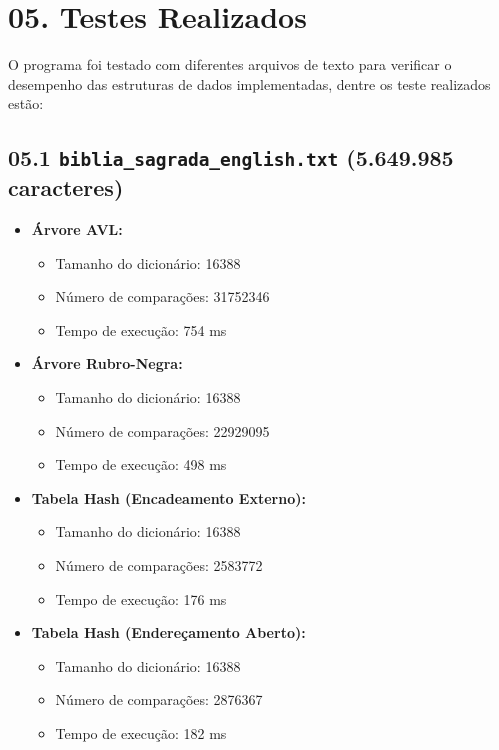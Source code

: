 \documentclass{article}
\begin{document}
\section*{05. Testes Realizados}

O programa foi testado com diferentes arquivos de texto para verificar o desempenho das estruturas de dados implementadas, dentre os teste realizados estão:


\subsection*{05.1 \texttt{biblia\_sagrada\_english.txt} (5.649.985 caracteres)}

\begin{itemize}
    \item \textbf{Árvore AVL:}
    \begin{itemize}
        \item Tamanho do dicionário: 16388
        \item Número de comparações: 31752346
        \item Tempo de execução: 754 ms
    \end{itemize}
    
    \item \textbf{Árvore Rubro-Negra:}
    \begin{itemize}
        \item Tamanho do dicionário: 16388
        \item Número de comparações: 22929095
        \item Tempo de execução: 498 ms
    \end{itemize}
    
    \item \textbf{Tabela Hash (Encadeamento Externo):}
    \begin{itemize}
        \item Tamanho do dicionário: 16388
        \item Número de comparações: 2583772
        \item Tempo de execução: 176 ms
    \end{itemize}
    
    \item \textbf{Tabela Hash (Endereçamento Aberto):}
    \begin{itemize}
        \item Tamanho do dicionário: 16388
        \item Número de comparações: 2876367
        \item Tempo de execução: 182 ms
    \end{itemize}
\end{itemize}
\end{document}
